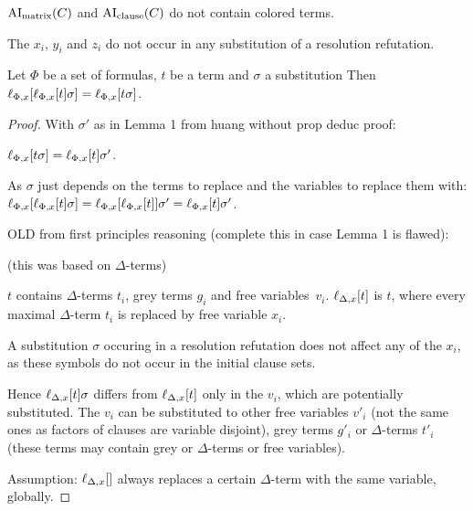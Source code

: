 \documentclass[,%
	paper=a4,%
	DIV14, 
	liststotoc,
	bibtotoc,
	draft=false,%
	numbers=noendperiod
]{scrartcl}
\begin{document}
\begin{lemma}
	$\operatorname{AI}_\mathrm{matrix}(C)$ and $\operatorname{AI}_\mathrm{clause}(C)$ do not contain colored terms.
	\label{lemma:no_colored_terms}
\end{lemma}

\begin{lemma}
	The $x_i$, $y_i$ and $z_i$ do not occur in any substitution of a resolution refutation. 
\end{lemma}

\begin{lemma}
	Let $\Phi$ be a set of formulas, $t$ be a term and $\sigma$ a substitution
	Then
	$\ell_{\Phi,x}[\ell_{\Phi,x}[t] \sigma] = \ell_{\Phi,x}[t\sigma]$.
	\label{lemma:lift_multiple_times}
\end{lemma}
\begin{proof}

	With $\sigma'$ as in Lemma 1 from huang without prop deduc proof:

	$\ell_{\Phi,x}[t\sigma] = \ell_{\Phi,x}[t]\sigma'$.

	As $\sigma$ just depends on the terms to replace and the variables to replace them with: 
	\newline
	$\ell_{\Phi,x}[\ell_{\Phi,x}[t]\sigma] = \ell_{\Phi,x}[\ell_{\Phi,x}[t]]\sigma' = \ell_{\Phi,x}[t]\sigma' $. \qedhere

	OLD from first principles reasoning (complete this in case Lemma 1 is flawed):

	{
		
		\tiny

		(this was based on $\Delta$-terms)

	$t$ contains $\Delta$-terms $t_i$, grey terms $g_i$ and free variables~$v_i$.
	$\ell_{\Delta,x}[t]$ is $t$, where every maximal $\Delta$-term $t_i$ is replaced by free variable $x_i$.

	A substitution $\sigma$ occuring in a resolution refutation does not affect any of the $x_i$, as these symbols do not occur in the initial clause sets.

	Hence $\ell_{\Delta,x}[t] \sigma $ differs from $\ell_{\Delta,x}[t]$ only in the $v_i$, which are potentially substituted.
	The $v_i$ can be substituted to other free variables $v'_i$ (not the same ones as factors of clauses are variable disjoint), grey terms $g'_i$ or $\Delta$-terms $t'_i$ (these terms may contain grey or $\Delta$-terms or free variables).

	Assumption: $\lifdelta$ always replaces a certain $\Delta$-term with the same variable, globally.
	
}
\end{proof}
\end{document}
